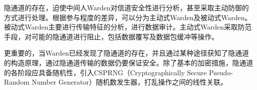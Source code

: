 隐通道的存在，迫使中间人Warden对信道安全性进行分析，甚至采取主动防御的方式进行处理。根据参与程度的差异，可以分为主动式Warden及被动式Warden。被动式Warden主要进行传输特征的分析，进行数据审计。主动式Warden采取防范手段，对可能的隐通道进行阻止，包括数据覆写及数据包缓冲等操作。

更重要的，当Warden已经发现了隐通道的存在，并且通过某种途径获知了隐通道的构造原理，通过隐通道传输的数据仍要保证安全。除了基本的加密措施，隐通道的各阶段应具备随机性，引入CSPRNG（Cryptographically Secure Pseudo-Random Number Generator）随机数发生器，打乱操作之间的线性关联。